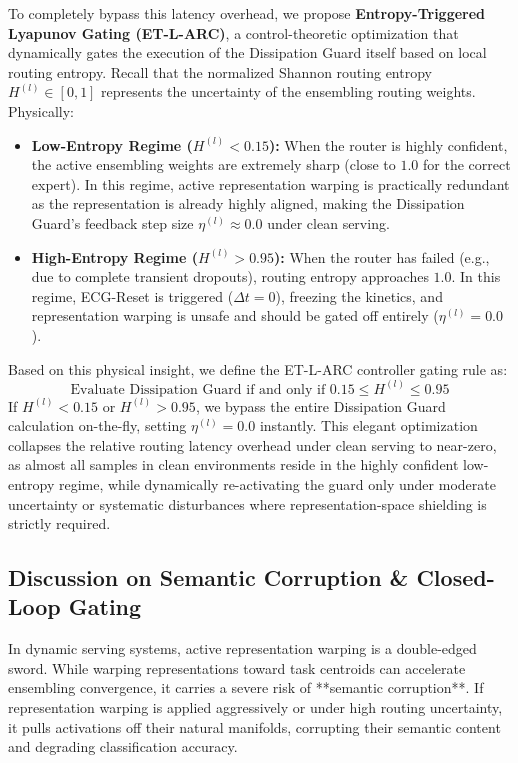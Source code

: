 To completely bypass this latency overhead, we propose \textbf{Entropy-Triggered Lyapunov Gating (ET-L-ARC)}, a control-theoretic optimization that dynamically gates the execution of the Dissipation Guard itself based on local routing entropy. Recall that the normalized Shannon routing entropy $H^{(l)} \in [0, 1]$ represents the uncertainty of the ensembling routing weights. Physically:
\begin{itemize}
    \item \textbf{Low-Entropy Regime ($H^{(l)} < 0.15$):} When the router is highly confident, the active ensembling weights are extremely sharp (close to $1.0$ for the correct expert). In this regime, active representation warping is practically redundant as the representation is already highly aligned, making the Dissipation Guard's feedback step size $\eta^{(l)} \approx 0.0$ under clean serving.
    \item \textbf{High-Entropy Regime ($H^{(l)} > 0.95$):} When the router has failed (e.g., due to complete transient dropouts), routing entropy approaches $1.0$. In this regime, ECG-Reset is triggered ($\Delta t = 0$), freezing the kinetics, and representation warping is unsafe and should be gated off entirely ($\eta^{(l)} = 0.0$).
\end{itemize}

Based on this physical insight, we define the ET-L-ARC controller gating rule as:
\begin{equation}
\text{Evaluate Dissipation Guard if and only if } 0.15 \le H^{(l)} \le 0.95
\label{eq:et_gating_rule}
\end{equation}
If $H^{(l)} < 0.15$ or $H^{(l)} > 0.95$, we bypass the entire Dissipation Guard calculation on-the-fly, setting $\eta^{(l)} = 0.0$ instantly. This elegant optimization collapses the relative routing latency overhead under clean serving to near-zero, as almost all samples in clean environments reside in the highly confident low-entropy regime, while dynamically re-activating the guard only under moderate uncertainty or systematic disturbances where representation-space shielding is strictly required.

\subsection{Discussion on Semantic Corruption \& Closed-Loop Gating}
In dynamic serving systems, active representation warping is a double-edged sword. While warping representations toward task centroids can accelerate ensembling convergence, it carries a severe risk of **semantic corruption**. If representation warping is applied aggressively or under high routing uncertainty, it pulls activations off their natural manifolds, corrupting their semantic content and degrading classification accuracy.

